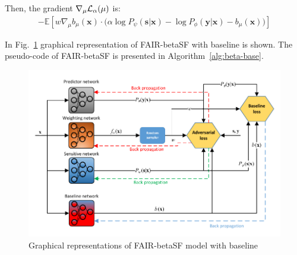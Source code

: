 \documentclass[preprint,12pt]{elsarticle}
\begin{document}
Then, the gradient $\nabla_\mu{\cal L}_\alpha(\mu)$ is:
\begin{equation*}
\begin{split}
-\mathbb{E} [w \nabla_\mu b_\mu(\mathbf{x})\cdot\big(\alpha \log P_\psi(\mathbf{s}|\mathbf{x}) - \log P_\phi(\mathbf{y}|\mathbf{x}) - b_\mu(\mathbf{x})\big)]
\end{split}
\end{equation*}

In Fig.~\ref{fig:Fig2} graphical representation of FAIR-betaSF with baseline is shown. The pseudo-code of FAIR-betaSF is presented in Algorithm~\ref{alg:beta-base}.

\begin{figure}[h!]
	\center
	\includegraphics[width=1\textwidth]{Fig2.pdf}
	\captionsetup{justification=centering}
	\caption{Graphical representations of FAIR-betaSF model with baseline}
	\label{fig:Fig2}
\end{figure}
\end{document}
